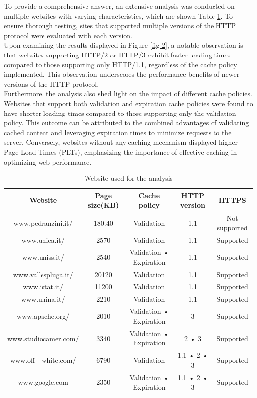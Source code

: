 \documentclass[eng]{class}
\begin{document}
To provide a comprehensive answer, an extensive analysis was conducted on multiple websites with varying characteristics, which are shown Table \ref{tab-2}.
To ensure thorough testing, sites that supported multiple versions of the HTTP protocol were evaluated with each version.\\
Upon examining the results displayed in Figure \ref{fig-2}, a notable observation is that websites supporting HTTP/2 or HTTP/3
exhibit faster loading times compared to those supporting only HTTP/1.1, regardless of the cache policy implemented.
This observation underscores the performance benefits of newer versions of the HTTP protocol.\\
Furthermore, the analysis also shed light on the impact of different cache policies.
Websites that support both validation and expiration cache policies were found to have shorter loading times compared to those supporting
only the validation policy. This outcome can be attributed to the combined advantages of validating cached content and
leveraging expiration times to minimize requests to the server. Conversely, websites without any caching mechanism displayed higher Page Load Times (PLTs),
emphasizing the importance of effective caching in optimizing web performance.
\begin{table}[H]
  \tiny
  \centering
  \begin{tabular}{|c|c|c|c|c|}
    \hline
    \linewidth=0cm
    Website              & Page size(KB) & Cache policy            & HTTP version & HTTPS         \\
    \hline
    www.pedranzini.it/   & 180.40        & Validation              & 1.1          & Not supported \\
    www.unica.it/        & 2570          & Validation              & 1.1          & Supported     \\
    www.uniss.it/        & 2540          & Validation • Expiration & 1.1          & Supported     \\
    www.vallespluga.it/  & 20120         & Validation              & 1.1          & Supported     \\
    www.istat.it/        & 11200         & Validation              & 1.1          & Supported     \\
    www.unina.it/        & 2210          & Validation              & 1.1          & Supported     \\
    www.apache.org/      & 2010          & Validation • Expiration & 3            & Supported     \\
    www.studiocamer.com/ & 3340          & Validation • Expiration & 2 • 3        & Supported     \\
    www.off---white.com/ & 6790          & Validation              & 1.1 • 2 • 3  & Supported     \\
    www.google.com       & 2350          & Validation • Expiration & 1.1 • 2 • 3  & Supported     \\
    \hline
  \end{tabular}
  \caption{Website used for the analysis}
  \label{tab-2}
\end{table}
\end{document}
